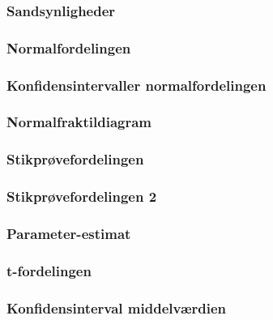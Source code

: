 \documentclass[]{book}
\begin{document}
\hypertarget{sandsynligheder}{%
\subsubsection{Sandsynligheder}\label{sandsynligheder}}

\hypertarget{normalfordelingen}{%
\subsubsection{Normalfordelingen}\label{normalfordelingen}}

\hypertarget{konfidensintervaller-normalfordelingen}{%
\subsubsection{Konfidensintervaller normalfordelingen}\label{konfidensintervaller-normalfordelingen}}

\hypertarget{normalfraktildiagram}{%
\subsubsection{Normalfraktildiagram}\label{normalfraktildiagram}}

\hypertarget{stikprvefordelingen}{%
\subsubsection{Stikprøvefordelingen}\label{stikprvefordelingen}}

\hypertarget{stikprvefordelingen-2}{%
\subsubsection{Stikprøvefordelingen 2}\label{stikprvefordelingen-2}}

\hypertarget{parameter-estimat}{%
\subsubsection{Parameter-estimat}\label{parameter-estimat}}

\hypertarget{t-fordelingen}{%
\subsubsection{t-fordelingen}\label{t-fordelingen}}

\hypertarget{konfidensinterval-middelvrdien}{%
\subsubsection{Konfidensinterval middelværdien}\label{konfidensinterval-middelvrdien}}
\end{document}
